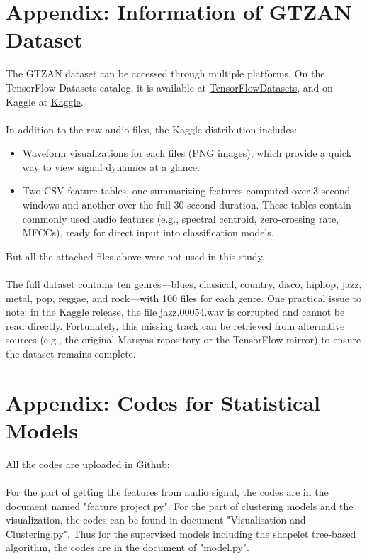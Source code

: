 \section{Appendix: Information of GTZAN Dataset}\label{app:B}
The GTZAN dataset can be accessed through multiple platforms. On the TensorFlow Datasets catalog, it is available at \href{https://www.tensorflow.org/datasets/catalog/gtzan}{TensorFlowDatasets},
and on Kaggle at
\href{https://www.kaggle.com/datasets/andradaolteanu/gtzan-dataset-music-genre-classification}{Kaggle}.\\
\\
In addition to the raw audio files, the Kaggle distribution includes:
\begin{itemize}
	\item Waveform visualizations for each files (PNG images), which provide a quick way to view signal dynamics at a glance.
	\item Two CSV feature tables, one summarizing features computed over 3-second windows and another over the full 30-second duration. These tables contain commonly used audio features (e.g., spectral centroid, zero-crossing rate, MFCCs), ready for direct input into classification models.
\end{itemize}
But all the attached files above were not used in this study.\\
\\
The full dataset contains ten genres—blues, classical, country, disco, hiphop, jazz, metal, pop, reggae, and rock—with 100 files for each genre. One practical issue to note: in the Kaggle release, the file jazz.00054.wav is corrupted and cannot be read directly. Fortunately, this missing track can be retrieved from alternative sources (e.g., the original Marsyas repository or the TensorFlow mirror) to ensure the dataset remains complete.

\newpage
\section{Appendix: Codes for Statistical Models}\label{app:C}
All the codes are uploaded in Github:\\
\\
For the part of getting the features from audio signal, the codes are in the document named "feature project.py". For the part of clustering models and the visualization, the codes can be found in document "Visualisation and Clustering.py". Thus for the supervised models including the shapelet tree-based algorithm, the codes are in the document of "model.py".\\
\\

